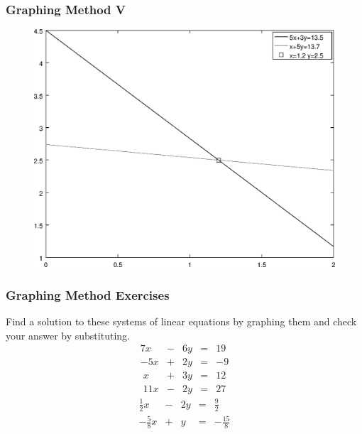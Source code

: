 \documentclass[xcolor=dvipsnames]{beamer}
\begin{document}
\begin{frame}
  \frametitle{Graphing Method V}
  \begin{figure}[h]
    \includegraphics[scale=.6]{./diagrams/gm-03-SystemsEquations-04.eps}
  \end{figure}
\end{frame}

\begin{frame}
  \frametitle{Graphing Method Exercises}
Find a solution to these systems of linear equations by graphing them
and check your answer by substituting.
  \begin{equation}
    \label{eq:fiesebah}
    \begin{array}{rcrcl}
      7x&-&6y&=&19 \\
      -5x&+&2y&=&-9
    \end{array}
  \end{equation}
  \begin{equation}
    \label{eq:weaseiwa}
    \begin{array}{rcrcl}
      x&+&3y&=&12 \\
      11x&-&2y&=&27
    \end{array}
  \end{equation}
  \begin{equation}
    \label{eq:yaetooni}
    \begin{array}{rcrcl}
      \frac{1}{2}x&-&2y&=&\frac{9}{2} \\
      -\frac{5}{8}x&+&y&=&-\frac{15}{8}
    \end{array}
  \end{equation}
\end{frame}
\end{document}
